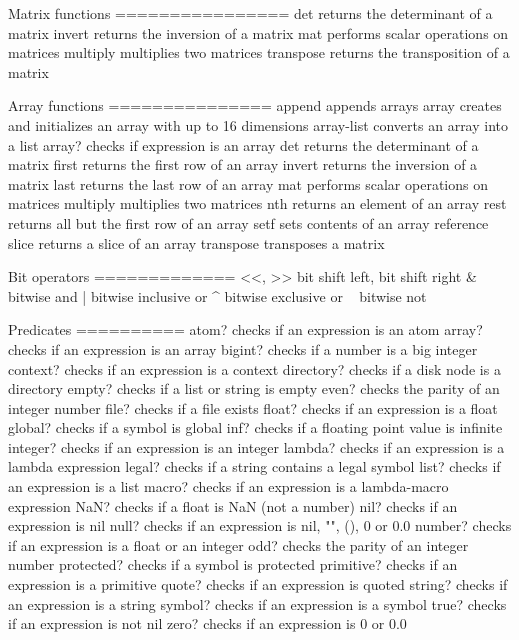 \documentclass[cn,11pt]{elegantbook}
\begin{document}
Matrix functions
================
det               returns the determinant of a matrix
invert            returns the inversion of a matrix
mat               performs scalar operations on matrices
multiply          multiplies two matrices
transpose         returns the transposition of a matrix

Array functions
===============
append            appends arrays
array             creates and initializes an array with up to 16 dimensions
array-list        converts an array into a list
array?            checks if expression is an array
det               returns the determinant of a matrix
first             returns the first row of an array
invert            returns the inversion of a matrix
last              returns the last row of an array
mat               performs scalar operations on matrices
multiply          multiplies two matrices
nth               returns an element of an array
rest              returns all but the first row of an array
setf              sets contents of an array reference
slice             returns a slice of an array
transpose         transposes a matrix

Bit operators
=============
<<, >>            bit shift left, bit shift right
&                 bitwise and
|                 bitwise inclusive or
^                 bitwise exclusive or
~                 bitwise not

Predicates
==========
atom?             checks if an expression is an atom
array?            checks if an expression is an array
bigint?           checks if a number is a big integer
context?          checks if an expression is a context
directory?        checks if a disk node is a directory
empty?            checks if a list or string is empty
even?             checks the parity of an integer number
file?             checks if a file exists
float?            checks if an expression is a float
global?           checks if a symbol is global
inf?              checks if a floating point value is infinite
integer?          checks if an expression is an integer
lambda?           checks if an expression is a lambda expression
legal?            checks if a string contains a legal symbol
list?             checks if an expression is a list
macro?            checks if an expression is a lambda-macro expression
NaN?              checks if a float is NaN (not a number)
nil?              checks if an expression is nil
null?             checks if an expression is nil, "", (), 0 or 0.0
number?           checks if an expression is a float or an integer
odd?              checks the parity of an integer number
protected?        checks if a symbol is protected
primitive?        checks if an expression is a primitive
quote?            checks if an expression is quoted
string?           checks if an expression is a string
symbol?           checks if an expression is a symbol
true?             checks if an expression is not nil
zero?             checks if an expression is 0 or 0.0
\end{document}
